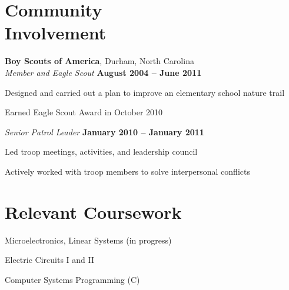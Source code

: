 \documentclass[margin,line,letterpaper]{resume}
\begin{document}
\begin{resume}
    \section{\mysidestyle Community\\Involvement}


    \textbf{Boy Scouts of America}, Durham, North Carolina \vspace{2mm}\\\vspace{1mm}%
    \textsl{Member and Eagle Scout} \hfill \textbf{August 2004 -- June 2011}\vspace{-3mm}\\\vspace{-1mm}%
    \begin{list2}
    \item Designed and carried out a plan to improve an elementary school nature trail
    \item Earned Eagle Scout Award in October 2010
    \end{list2}\vspace{-1.5mm}

    \textsl{Senior Patrol Leader} \hfill \textbf{January 2010 -- January 2011}\vspace{-3mm}\\\vspace{-1mm}%
    \begin{list2}
    \item Led troop meetings, activities, and leadership council
    \item Actively worked with troop members to solve interpersonal conflicts
    \end{list2}\vspace{-1.5mm}


    \section{\mysidestyle Relevant Coursework}

    \begin{list2}
    \item Microelectronics, Linear Systems (in progress)
    \item Electric Circuits I and II
    \item Computer Systems Programming (C)
    \end{list2}\vspace{-1.5mm}



\end{resume}
\end{document}
